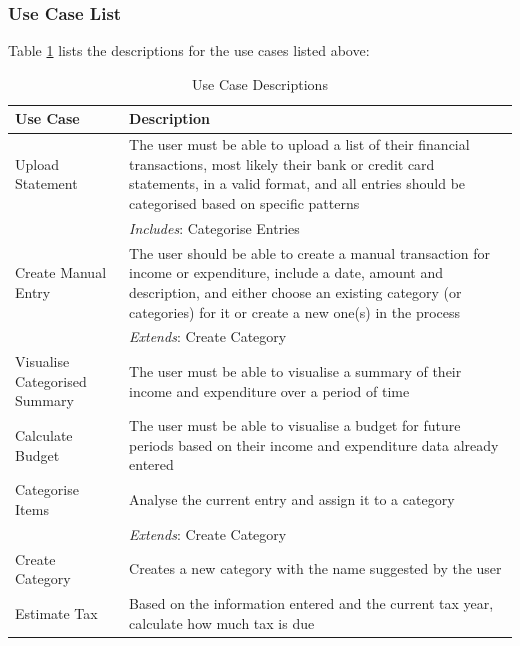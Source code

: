\subsubsection{Use Case List} \label{sec:Requirements.FunctionalRequirements.UseCaseList}
Table \ref{tab:UseCaseDescriptions} lists the descriptions for the use cases
listed above:
\begin{table}[ht!]
  \centering
  \begin{tabular}{|p{4cm}|p{12cm}|}
    \hline
    \textbf{Use Case}&\textbf{Description}\\
    \hline
    Upload Statement&The user must be able to upload a list of their
                     financial transactions, most likely their bank
                     or credit card statements, in a valid format, and all
                     entries should be categorised based on specific patterns\\
                    &\emph{Includes}: Categorise Entries\\
    \hline
    Create Manual Entry&The user should be able to create a manual transaction for
                        income or expenditure, include a date, amount and
                        description, and either choose an existing category (or
                        categories) for it or create a new one(s) in the
                        process\\
                        &\emph{Extends}: Create Category\\
    \hline
    Visualise Categorised Summary&The user must be able to visualise
                                  a summary of their income and expenditure
                                  over a period of time\\
    \hline
    Calculate Budget&The user must be able to visualise a budget for future
                     periods based on their income and expenditure data 
                     already entered\\
    \hline
    Categorise Items&Analyse the current entry and assign it to a category\\
                    &\emph{Extends}: Create Category\\
    \hline
    Create Category&Creates a new category with the name suggested by the
                        user\\
    \hline
    Estimate Tax&Based on the information entered and the current tax year,
                 calculate how much tax is due\\
    \hline
  \end{tabular}
  \caption{Use Case Descriptions} \label{tab:UseCaseDescriptions}
\end{table}
\FloatBarrier


